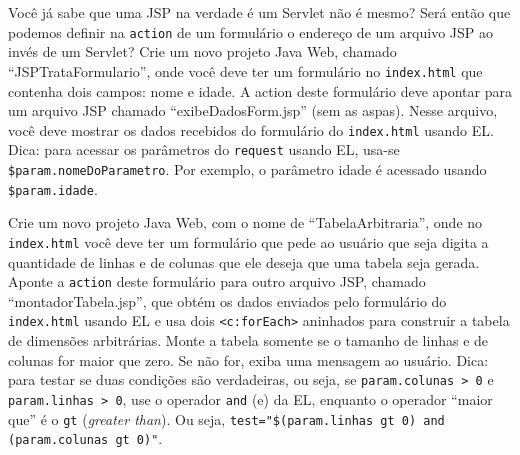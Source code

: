 \begin{projetoSemArquivo}{}{}{}
    Você já sabe que uma JSP na verdade é um Servlet não é mesmo? Será então que podemos definir na \texttt{action} de um formulário o endereço de um arquivo JSP ao invés de um Servlet? Crie um novo projeto Java Web, chamado ``JSPTrataFormulario'', onde você deve ter um formulário no \texttt{index.html} que contenha dois campos: nome e idade. A action deste formulário deve apontar para um arquivo JSP chamado ``exibeDadosForm.jsp'' (sem as aspas). Nesse arquivo, você deve mostrar os dados recebidos do formulário do \texttt{index.html} usando EL. Dica: para acessar os parâmetros do \texttt{request} usando EL, usa-se \texttt{\${param.nomeDoParametro}}. Por exemplo, o parâmetro idade é acessado usando \texttt{\${param.idade}}.
\end{projetoSemArquivo}

\begin{projetoSemArquivo}{}{}{}
    Crie um novo projeto Java Web, com o nome de ``TabelaArbitraria'', onde no \texttt{index.html} você deve ter um formulário que pede ao usuário que seja digita a quantidade de linhas e de colunas que ele deseja que uma tabela seja gerada. Aponte a \texttt{action} deste formulário para outro arquivo JSP, chamado ``montadorTabela.jsp'', que obtém os dados enviados pelo formulário do \texttt{index.html} usando EL e usa dois \texttt{<c:forEach>} aninhados para construir a tabela de dimensões arbitrárias. Monte a tabela somente se o tamanho de linhas e de colunas for maior que zero. Se não for, exiba uma mensagem ao usuário. Dica: para testar se duas condições são verdadeiras, ou seja, se \texttt{param.colunas > 0} e \texttt{param.linhas > 0}, use o operador \texttt{and} (e) da EL, enquanto o operador ``maior que'' é o \texttt{gt} (\textit{greater than}). Ou seja, \texttt{test="\${(param.linhas gt 0) and (param.colunas gt 0)}"}.
\end{projetoSemArquivo}
